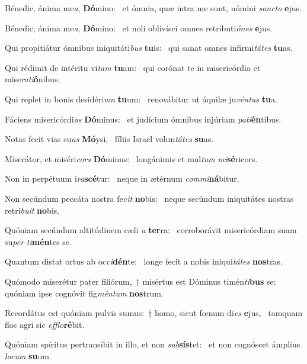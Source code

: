 \item Bénedic, ánima me\textit{a}, \textbf{Dó}mino:~\psstar{} et ómnia, quæ intra me sunt, nómini \textit{sancto} \textbf{e}jus.
\item Bénedic, ánima me\textit{a}, \textbf{Dó}mino:~\psstar{} et noli oblivísci omnes retributi\textit{ónes} \textbf{e}jus.
\item Qui propitiátur ómnibus iniquitáti\textit{bus} \textbf{tu}is:~\psstar{} qui sanat omnes infirmi\textit{tátes} \textbf{tu}as.
\item Qui rédimit de intéritu vi\textit{tam} \textbf{tu}am:~\psstar{} qui corónat te in misericórdia et mise\textit{rati}\textbf{ó}nibus.
\item Qui replet in bonis desidéri\textit{um} \textbf{tu}um:~\psstar{} renovábitur ut áquilæ ju\textit{véntus} \textbf{tu}a.
\item Fáciens misericórdi\textit{as} \textbf{Dó}minus:~\psstar{} et judícium ómnibus injúriam \textit{pati}\textbf{én}tibus.
\item Notas fecit vias su\textit{as} \textbf{Mó}ysi,~\psstar{} fíliis Israël volun\textit{tátes} \textbf{su}as.
\item Miserátor, et miséri\textit{cors} \textbf{Dó}minus:~\psstar{} longánimis et mul\textit{tum} \textit{mi}\textbf{sé}ricors.
\item Non in perpétuum i\textit{ra}\textbf{scé}tur:~\psstar{} neque in ætérnum \textit{commi}\textbf{ná}bi\-tur.
\item Non secúndum peccáta nostra fe\textit{cit} \textbf{no}bis:~\psstar{} neque secúndum iniquitátes nostras retrí\textit{buit} \textbf{no}bis.
\item Quóniam secúndum altitúdinem cæli \textit{a} \textbf{ter}ra:~\psstar{} corroborávit misericórdiam suam su\textit{per} \textit{ti}\textbf{mén}tes se.
\item Quantum distat ortus ab oc\textit{ci}\textbf{dén}te:~\psstar{} longe fecit a nobis iniqui\textit{tátes} \textbf{nos}tras.
\item Quómodo miserétur pater filiórum,~† misértus est Dóminus timén\textit{ti}\textbf{bus} se:~\psstar{} quóniam ipse cognóvit fig\textit{méntum} \textbf{nos}trum.
\item Recordátus est quóniam pulvis sumus:~† homo, sicut fœnum di\textit{es} \textbf{e}jus,~\psstar{} tamquam flos agri sic \textit{efflo}\textbf{ré}bit.
\item Quóniam spíritus pertransíbit in illo, et non \textit{sub}\textbf{sís}tet:~\psstar{} et non cognóscet ámplius \textit{locum} \textbf{su}um.
